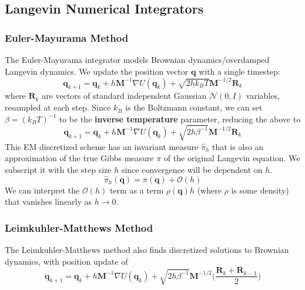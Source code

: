   \subsection{Langevin Numerical Integrators}

    \subsubsection{Euler-Mayurama Method}

      The Euler-Mayurama integrator models Brownian dynamics/overdamped Langevin dynamics. We update the position vector $\mathbf{q}$ with a single timestep: 
      \begin{equation}
        \mathbf{q}_{k+1} = \mathbf{q}_k + h \mathbf{M}^{-1} \nabla U(\mathbf{q}_k) + \sqrt{2 h k_B T} \mathbf{M}^{-1/2} \mathbf{R}_k
      \end{equation}
      where $\mathbf{R}_k$ are vectors of standard independent Gaussian $\mathcal{N}(0, I)$ variables, resampled at each step. Since $k_B$ is the Boltzmann constant, we can set $\beta = (k_B T)^{-1}$ to be the \textbf{inverse temperature} parameter, reducing the above to 
      \begin{equation}
        \mathbf{q}_{k+1} = \mathbf{q}_k + h \mathbf{M}^{-1} \nabla U(\mathbf{q}_k) + \sqrt{2 h \beta^{-1}} \mathbf{M}^{-1/2} \mathbf{R}_k
      \end{equation}
      This EM discretized scheme has an invariant measure $\hat{\pi}_h$ that is also an approximation of the true Gibbs measure $\pi$ of the original Langevin equation. We subscript it with the step size $h$ since convergence will be dependent on $h$. 
      \begin{equation}
        \hat{\pi}_h (\mathbf{q}) = \pi(\mathbf{q}) + \mathcal{O}(h)
      \end{equation}
      We can interpret the $\mathcal{O}(h)$ term as a term $\rho(\mathbf{q}) h$ (where $\rho$ is some density) that vanishes linearly as $h \rightarrow 0$. 

    \subsubsection{Leimkuhler-Matthews Method}

      The Leimkuhler-Matthews method also finds discretized solutions to Brownian dynamics, with position update of 
      \begin{equation}
        \mathbf{q}_{k+1} = \mathbf{q}_k + h \mathbf{M}^{-1} \nabla U(\mathbf{q}_k) + \sqrt{2 h \beta^{-1}} \mathbf{M}^{-1/2} \bigg( \frac{\mathbf{R}_k + \mathbf{R}_{k-1}}{2} \bigg)
      \end{equation}


